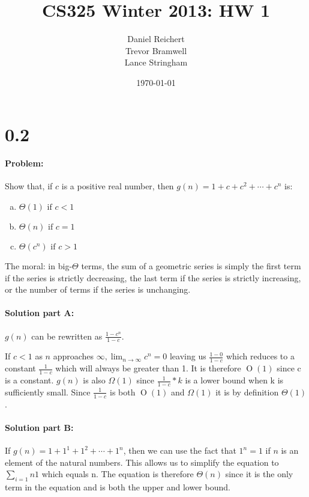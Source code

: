 \documentclass[12pt]{article}
\title{CS325 Winter 2013: HW 1}
\author{
    Daniel Reichert \\
    Trevor Bramwell \\
    Lance Stringham
}
\date{\today}
\newcommand{\BigO}[1]{\ensuremath{\operatorname{O}\left(#1\right)}}
\begin{document}
\maketitle

\section*{0.2}
\paragraph{Problem:}
Show that, if $c$ is a positive real number, then $g(n)=1+c+c^2+\cdots+c^n$ is:

\begin{enumerate}[(a)]
\item $\Theta(1) \text{ if } c < 1$
\item $\Theta(n) \text{ if } c = 1$
\item $\Theta(c^n) \text{ if } c > 1$
\end{enumerate}

The moral: in big-$\Theta$ terms, the sum of a geometric series is simply the
first term if the series is
strictly decreasing, the last term if the series is strictly increasing,
or the number of terms if the
series is unchanging.

\paragraph{Solution part A:}
$g(n)$ can be rewritten as $\frac{1-c^n}{1-c}$.

If $c < 1$ as $n$ approaches $\infty, \lim_{n \to \infty} c^n = 0$ leaving us
$\frac{1-0}{1-c}$ which reduces to a constant $\frac{1}{1-c}$ which will always
be greater than 1. It is therefore $\BigO{1}$ since c is a constant. $g(n)$ is also
$\Omega(1)$ since $\frac{1}{1-c}*k$ is a lower bound when k is sufficiently small.
Since $\frac{1}{1-c}$ is both $\BigO{1}$ and $\Omega(1)$ it is by
definition $\Theta(1)$.

\paragraph{Solution part B:}
If $g(n)=1+1^1+1^2+\cdots+1^n$, then we can use the fact that $1^n=1$ if $n$ is an
element of the natural numbers. This allows us to simplify the equation to
$\sum_{i=1}{n}1$ which equals n. The equation is therefore $\Theta(n)$ since it is
the only term in the equation and is both the upper and lower bound.
\end{document}
